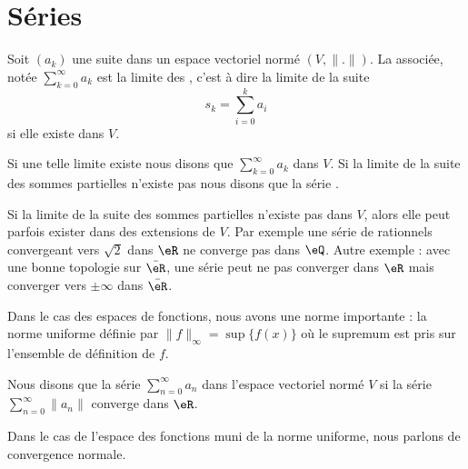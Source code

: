\section{Séries}

\begin{definition}\label{DefGFHAaOL}
Soit \( (a_k)\) une suite dans un espace vectoriel normé \( (V,\| . \| )\). La  associée, notée \( \sum_{k=0}^{\infty}a_k\) est la limite des , c'est à dire la limite de la suite
    \begin{equation}
        s_k=\sum_{i=0}^ka_i
    \end{equation}
    si elle existe dans \( V\).

    Si une telle limite existe nous disons que \( \sum_{k=0}^{\infty}a_k\)  dans \( V\). Si la limite de la suite des sommes partielles n'existe pas nous disons que la série .
\end{definition}
\begin{remark}
    Si la limite de la suite des sommes partielles n'existe pas dans \( V\), alors elle peut parfois exister dans des extensions de \( V\). Par exemple une série de rationnels convergeant vers \( \sqrt{2}\) dans \( \eR\) ne converge pas dans \( \eQ\). Autre exemple : avec une bonne topologie sur \( \bar \eR\), une série peut ne pas converger dans \( \eR\) mais converger vers \( \pm\infty\) dans \( \bar \eR\).
\end{remark}

Dans le cas des espaces de fonctions, nous avons une norme importante : la norme uniforme définie par \( \| f \|_{\infty}=\sup\{ f(x) \}\) où le supremum est pris sur l'ensemble de définition de \( f\).
\begin{definition} \label{DefVFUIXwU}
    Nous disons que la série \( \sum_{n=0}^{\infty}a_n\) dans l'espace vectoriel normé \( V\)  si la série \( \sum_{n=0}^{\infty}\| a_n \|\) converge dans \( \eR\).
\end{definition}

Dans le cas de l'espace des fonctions muni de la norme uniforme, nous parlons de convergence normale.

